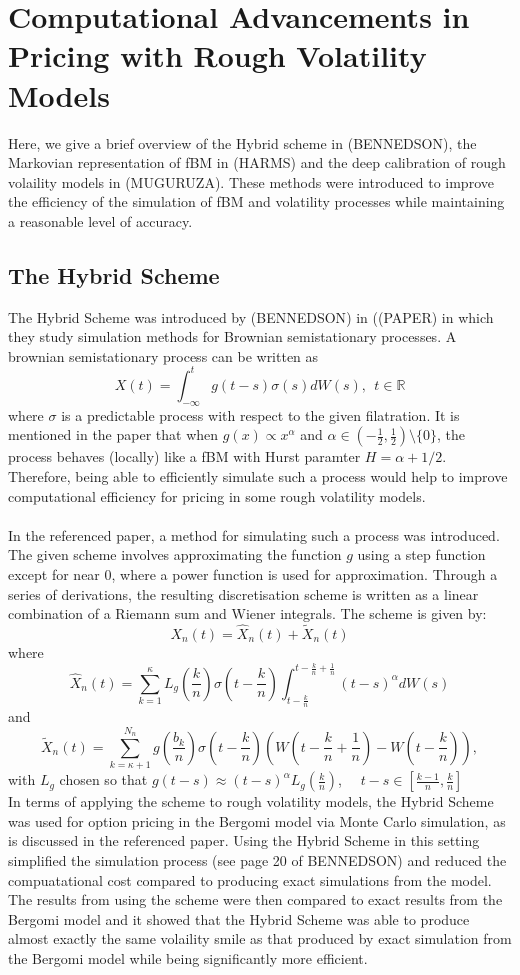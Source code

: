 \documentclass[12pt]{article}
\begin{document}
\section{Computational Advancements in Pricing with Rough Volatility Models}
Here, we give a brief overview of the Hybrid scheme in ({\color{red}BENNEDSON}), the Markovian representation of fBM in ({\color{red}HARMS}) and the deep calibration of rough volaility models in ({\color{red}MUGURUZA}). These methods were introduced to improve the efficiency of the simulation of fBM and volatility processes while maintaining a reasonable level of accuracy.
\subsection{The Hybrid Scheme}
The Hybrid Scheme was introduced by ({\color{red}BENNEDSON}) in (({\color{red}PAPER}) in which they study simulation methods for Brownian semistationary processes. A brownian semistationary process can be written as $$X(t)=\int_{-\infty}^t g(t-s) \sigma(s) dW(s),  \ \  t\in\mathbb{R}$$ where $\sigma$ is a predictable process with respect to the given filatration. It is mentioned in the paper that when $g(x) \propto x^\alpha$ and $\alpha \in (-\frac{1}{2}, \frac{1}{2}) \setminus \{0\}$, the process behaves (locally) like a fBM with Hurst paramter $H=\alpha+1/2$.  Therefore, being able to efficiently simulate such a process would help to improve computational efficiency for pricing in some rough volatility models.  
\\
\\
In the referenced paper, a method for simulating such a process was introduced. The given scheme involves approximating the function $g$ using a step function except for near 0, where a power function is used for approximation. Through a series of derivations,  the resulting discretisation scheme is written as a linear combination of a Riemann sum and Wiener integrals. The scheme is given by: $$X_n(t) = \hat{X}_n(t) + \tilde{X}_n(t)$$ where $$\hat{X}_n(t) = \sum_{k=1}^{\kappa} L_g(\frac{k}{n}) \sigma (t-\frac{k}{n}) \int_{t-\frac{k}{n}}^{t-\frac{k}{n}+\frac{1}{n}}(t-s)^\alpha dW(s)$$ and $$\tilde{X}_n(t) = \sum_{k=\kappa+1}^{N_n}g(\frac{b_k}{n})\sigma(t-\frac{k}{n})(W(t-\frac{k}{n}+\frac{1}{n})-W(t-\frac{k}{n})),$$ with $L_g$ chosen so that $g(t-s) \approx (t-s)^\alpha L_g(\frac{k}{n})$, \ \ $t-s \in [\frac{k-1}{n},\frac{k}{n}]$
\\
In terms of applying the scheme to rough volatility models, the Hybrid Scheme was used for option pricing in the Bergomi model via Monte Carlo simulation, as is discussed in the referenced paper. Using the Hybrid Scheme in this setting simplified the simulation process ({\color{red}see page 20 of BENNEDSON}) and reduced the compuatational cost compared to producing exact simulations from the model.  The results from using the scheme were then compared to exact results from the Bergomi model and it showed that the Hybrid Scheme was able to produce almost exactly the same volaility smile as that produced by exact simulation from the Bergomi model while being significantly more efficient.
\end{document}
